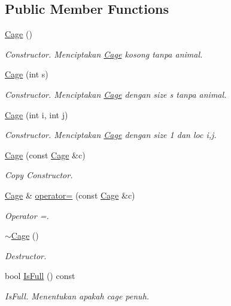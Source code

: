 \subsection*{Public Member Functions}
\begin{DoxyCompactItemize}
\item 
\hyperlink{classCage_ac03246dd263ee9fe6f37336317e62b69}{Cage} ()
\begin{DoxyCompactList}\small\item\em Constructor. Menciptakan \hyperlink{classCage}{Cage} kosong tanpa animal. \end{DoxyCompactList}\item 
\hyperlink{classCage_a8cd728b1eb23303888a153230f96490e}{Cage} (int s)
\begin{DoxyCompactList}\small\item\em Constructor. Menciptakan \hyperlink{classCage}{Cage} dengan size s tanpa animal. \end{DoxyCompactList}\item 
\hyperlink{classCage_a105ec044af346561cc7165f69da8cf08}{Cage} (int i, int j)
\begin{DoxyCompactList}\small\item\em Constructor. Menciptakan \hyperlink{classCage}{Cage} dengan size 1 dan loc i,j. \end{DoxyCompactList}\item 
\hyperlink{classCage_ae85bb53517616422bf7f36282de01519}{Cage} (const \hyperlink{classCage}{Cage} \&c)
\begin{DoxyCompactList}\small\item\em Copy Constructor. \end{DoxyCompactList}\item 
\hyperlink{classCage}{Cage} \& \hyperlink{classCage_a020eefd2b5d15915cf65693413be64db}{operator=} (const \hyperlink{classCage}{Cage} \&c)
\begin{DoxyCompactList}\small\item\em Operator =. \end{DoxyCompactList}\item 
\hyperlink{classCage_a657259499dfc23c63fc65aeaf8abbb17}{$\sim$\+Cage} ()
\begin{DoxyCompactList}\small\item\em Destructor. \end{DoxyCompactList}\item 
bool \hyperlink{classCage_af244dea5f1b3645d3f216a16f353ddc7}{Is\+Full} () const 
\begin{DoxyCompactList}\small\item\em Is\+Full. Menentukan apakah cage penuh. \end{DoxyCompactList}\item 

\end{DoxyCompactItemize}
